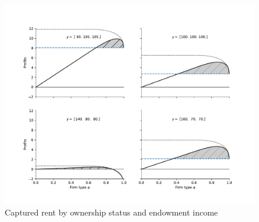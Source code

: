 \documentclass[11pt,english]{article}
\theoremstyle{plain}
\theoremstyle{definition}
\begin{document}
\begin{figure}
\includegraphics[scale=0.75]{Figure3.pdf}
\caption{\label{fig:nonprofit}Captured rent by ownership status and endowment
income}
\end{figure}
\end{document}
